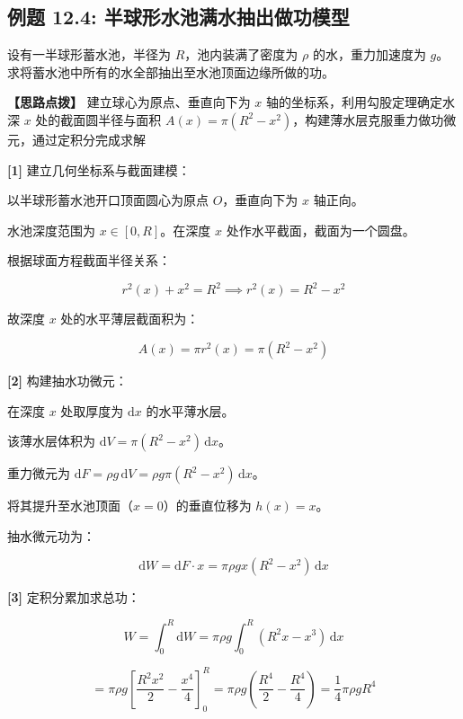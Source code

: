 \documentclass[11pt,a4paper,UTF8]{ctexart}
\begin{document}
\subsection{例题 12.4: 半球形水池满水抽出做功模型}

设有一半球形蓄水池，半径为 $R$，池内装满了密度为 $\rho$ 的水，重力加速度为 $g$。求将蓄水池中所有的水全部抽出至水池顶面边缘所做的功。

\textbf{\color{DeepPurple}【思路点拨】} 建立球心为原点、垂直向下为 $x$ 轴的坐标系，利用勾股定理确定水深 $x$ 处的截面圆半径与面积 $A(x) = \pi(R^2 - x^2)$，构建薄水层克服重力做功微元，通过定积分完成求解


\begin{solbox}[分步推导与答题规范]
\textbf{[1]} 建立几何坐标系与截面建模：

以半球形蓄水池开口顶面圆心为原点 $O$，垂直向下为 $x$ 轴正向。

水池深度范围为 $x \in [0, R]$。在深度 $x$ 处作水平截面，截面为一个圆盘。

根据球面方程截面半径关系：


\begin{equation*}
r^2(x) + x^2 = R^2 \implies r^2(x) = R^2 - x^2
\end{equation*}


故深度 $x$ 处的水平薄层截面积为：


\begin{equation*}
A(x) = \pi r^2(x) = \pi(R^2 - x^2)
\end{equation*}


\textbf{[2]} 构建抽水功微元：

在深度 $x$ 处取厚度为 $\mathrm{d}x$ 的水平薄水层。

该薄水层体积为 $\mathrm{d}V = \pi(R^2 - x^2)\,\mathrm{d}x$。

重力微元为 $\mathrm{d}F = \rho g\,\mathrm{d}V = \rho g \pi (R^2 - x^2)\,\mathrm{d}x$。

将其提升至水池顶面（$x = 0$）的垂直位移为 $h(x) = x$。

抽水微元功为：


\begin{equation*}
\mathrm{d}W = \mathrm{d}F \cdot x = \pi \rho g x (R^2 - x^2)\,\mathrm{d}x
\end{equation*}


\textbf{[3]} 定积分累加求总功：


\begin{equation*}
W = \int_0^R \mathrm{d}W = \pi \rho g \int_0^R (R^2 x - x^3)\,\mathrm{d}x
\end{equation*}



\begin{equation*}
= \pi \rho g \left[\frac{R^2 x^2}{2} - \frac{x^4}{4}\right]_0^R = \pi \rho g \left(\frac{R^4}{2} - \frac{R^4}{4}\right) = \frac{1}{4}\pi \rho g R^4
\end{equation*}

\end{solbox}
\end{document}
